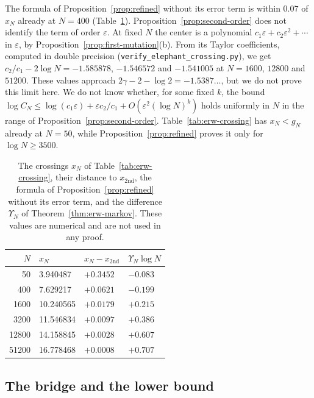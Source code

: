 \begin{remark}\label{rem:refined}
The formula of Proposition~\ref{prop:refined} without its error term is
within $0.07$ of $x_N$ already at $N=400$ (Table~\ref{tab:second}).
Proposition~\ref{prop:second-order} does not identify the term of order
$\varepsilon$. At fixed $N$ the center is a polynomial
$c_1\varepsilon+c_2\varepsilon^2+\cdots$ in $\varepsilon$, by
Proposition~\ref{prop:first-mutation}(b). From its Taylor coefficients,
computed in double precision (\texttt{verify\_elephant\_crossing.py}), we get
$c_2/c_1-2\log N=-1.585878$, $-1.546572$ and $-1.541005$ at $N=1600$, $12800$
and $51200$. These values approach $2\gamma-2-\log2=-1.5387\ldots$, but we do
not prove this limit here. We do not know whether, for some fixed $k$, the
bound
$\log C_N\le\log(c_1\varepsilon)+\varepsilon c_2/c_1+O(\varepsilon^2(\log N)^k)$
holds uniformly in $N$ in the range of Proposition~\ref{prop:second-order}.
Table~\ref{tab:erw-crossing} has $x_N<g_N$ already at $N=50$, while
Proposition~\ref{prop:refined} proves it only for $\log N\ge3500$.
\end{remark}

\begin{table}[htbp]
\centering\small
\caption{The crossings $x_N$ of Table~\ref{tab:erw-crossing}, their
distance to $x_{\mathrm{2nd}}$, the formula of
Proposition~\ref{prop:refined} without its error term, and the difference
$\Upsilon_N$ of Theorem~\ref{thm:erw-markov}. These values are
numerical and are not used in any proof.}
\label{tab:second}
\begin{tabular}{@{}rlll@{}}
\toprule
$N$ & $x_N$ & $x_N-x_{\mathrm{2nd}}$ & $\Upsilon_N\log N$\\
\midrule
50 & 3.940487 & $+0.3452$ & $-0.083$\\
400 & 7.629217 & $+0.0621$ & $-0.199$\\
1600 & 10.240565 & $+0.0179$ & $+0.215$\\
3200 & 11.546834 & $+0.0097$ & $+0.386$\\
12800 & 14.158845 & $+0.0028$ & $+0.607$\\
51200 & 16.778468 & $+0.0008$ & $+0.707$\\
\bottomrule
\end{tabular}
\end{table}

\subsection{The bridge and the lower bound}\label{app:erw-bridge}

